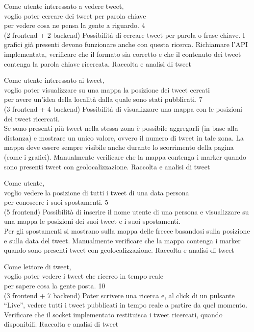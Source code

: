 \userstory%
{Come utente interessato a vedere tweet,\\voglio poter cercare dei tweet per parola chiave\\per vedere cosa ne pensa la gente a riguardo.}%
{4\\(2 frontend + 2 backend)}%
{Possibilità di cercare tweet per parola o frase chiave. I grafici già presenti devono funzionare anche con questa ricerca.}%
{Richiamare l'API implementata, verificare che il formato sia corretto e che il contenuto dei tweet contenga la parola chiave ricercata.}
{Raccolta e analisi di tweet}

\userstory%
{Come utente interessato ai tweet,\\voglio poter visualizzare su una mappa la posizione dei tweet cercati\\per avere un'idea della località dalla quale sono stati pubblicati.}%
{7\\(3 frontend + 4 backend)}%
{Possibilità di visualizzare una mappa con le posizioni dei tweet ricercati.\\
Se sono presenti più tweet nella stessa zona è possibile aggregarli (in base alla distanza) e mostrare un unico valore, 
ovvero il numero di tweet in tale zona. La mappa deve essere sempre visibile anche durante lo scorrimento della pagina (come i grafici).}%
{Manualmente verificare che la mappa contenga i marker quando sono presenti tweet con geolocalizzazione.}
{Raccolta e analisi di tweet}

\userstory%
{Come utente,\\voglio vedere la posizione di tutti i tweet di una data persona\\per conoscere i suoi spostamenti.}%
{5\\(5 frontend)}%
{Possibilità di inserire il nome utente di una persona e visualizzare su una mappa le posizioni dei suoi tweet e i suoi spostamenti.\\
Per gli spostamenti si mostrano sulla mappa delle frecce basandosi sulla posizione e sulla data del tweet.}%
{Manualmente verificare che la mappa contenga i marker quando sono presenti tweet con geolocalizzazione.}
{Raccolta e analisi di tweet}

\userstory%
{Come lettore di tweet,\\voglio poter vedere i tweet che ricerco in tempo reale\\per sapere cosa la gente posta.}%
{10\\(3 frontend + 7 backend)}%
{Poter scrivere una ricerca e, al click di un pulsante “Live”, vedere tutti i tweet pubblicati in tempo reale a partire da quel momento.}%
{Verificare che il socket implementato restituisca i tweet ricercati, quando disponibili.}
{Raccolta e analisi di tweet}

